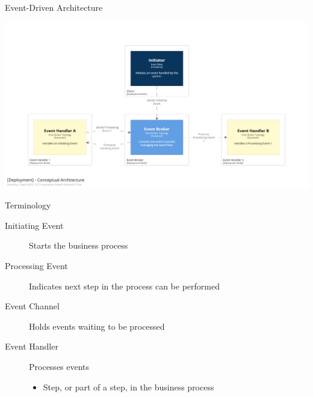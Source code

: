 \documentclass{slide}
\begin{document}

\begin{frame}{Event-Driven Architecture}
    \begin{adjustwidth}{-10mm}{-10mm}
        \centering
        \includegraphics[trim=195 195 195 195,clip,width=0.97\paperwidth]{../../notes/event/diagrams/conceptual-architecture.png}
    \end{adjustwidth}
\end{frame}

\begin{frame}{Terminology}
    \vspace{1mm}
    {\LARGE
    \begin{description}
        \item[Initiating Event] Starts the business process
        \vspace{3mm}
        \item[Processing Event] Indicates next step in the process can be performed
        \vspace{3mm}
        \item[Event Channel] Holds events waiting to be processed
        \vspace{3mm}
        \item[Event Handler] Processes events
        \begin{itemize}
            \Large\item Step, or part of a step, in the business process
	\end{itemize}
    \end{description}
    }
\end{frame}
\end{document}
